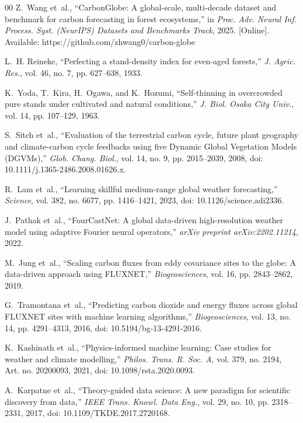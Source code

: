 \documentclass[conference]{IEEEtran}
\begin{document}
\begin{thebibliography}{00}
Z.~Wang et~al., ``CarbonGlobe: A global-scale, multi-decade dataset and benchmark for carbon forecasting in forest ecosystems,'' in \textit{Proc. Adv. Neural Inf. Process. Syst. (NeurIPS) Datasets and Benchmarks Track}, 2025. [Online]. Available: https://github.com/zhwang0/carbon-globe

L.~H. Reineke, ``Perfecting a stand-density index for even-aged forests,'' \textit{J. Agric. Res.}, vol. 46, no. 7, pp. 627--638, 1933.

K.~Yoda, T.~Kira, H.~Ogawa, and K.~Hozumi, ``Self-thinning in overcrowded pure stands under cultivated and natural conditions,'' \textit{J. Biol. Osaka City Univ.}, vol. 14, pp. 107--129, 1963.

S.~Sitch et~al., ``Evaluation of the terrestrial carbon cycle, future plant geography and climate-carbon cycle feedbacks using five Dynamic Global Vegetation Models (DGVMs),'' \textit{Glob. Chang. Biol.}, vol. 14, no. 9, pp. 2015--2039, 2008, doi: 10.1111/j.1365-2486.2008.01626.x.

R.~Lam et~al., ``Learning skillful medium-range global weather forecasting,'' \textit{Science}, vol. 382, no. 6677, pp. 1416--1421, 2023, doi: 10.1126/science.adi2336.

J.~Pathak et~al., ``FourCastNet: A global data-driven high-resolution weather model using adaptive Fourier neural operators,'' \textit{arXiv preprint arXiv:2202.11214}, 2022.

M.~Jung et~al., ``Scaling carbon fluxes from eddy covariance sites to the globe: A data-driven approach using FLUXNET,'' \textit{Biogeosciences}, vol. 16, pp. 2843--2862, 2019.

G.~Tramontana et~al., ``Predicting carbon dioxide and energy fluxes across global FLUXNET sites with machine learning algorithms,'' \textit{Biogeosciences}, vol. 13, no. 14, pp. 4291--4313, 2016, doi: 10.5194/bg-13-4291-2016.

K.~Kashinath et~al., ``Physics-informed machine learning: Case studies for weather and climate modelling,'' \textit{Philos. Trans. R. Soc. A}, vol. 379, no. 2194, Art. no. 20200093, 2021, doi: 10.1098/rsta.2020.0093.

A.~Karpatne et~al., ``Theory-guided data science: A new paradigm for scientific discovery from data,'' \textit{IEEE Trans. Knowl. Data Eng.}, vol. 29, no. 10, pp. 2318--2331, 2017, doi: 10.1109/TKDE.2017.2720168.


\end{thebibliography}
\end{document}
